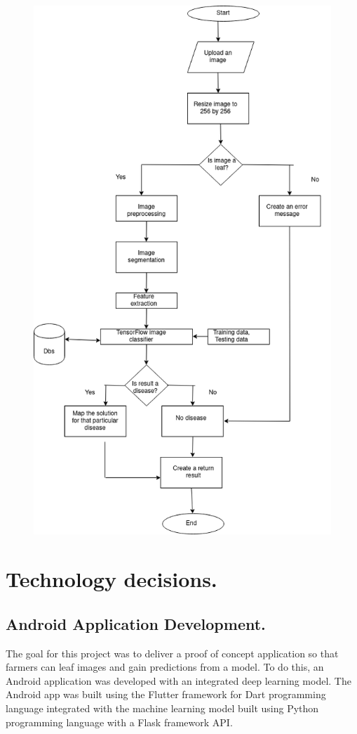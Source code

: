 \documentclass[11pt]{report}
\begin{document}
\begin{figure}[h]
	\centerline{\small 
		\includegraphics[height=0.5\textheight]  {flowchart}}
\end{figure}

\section{Technology decisions.}

\subsection{Android Application Development.}
The goal for this project was to deliver a proof of concept application so that farmers can leaf images and
gain predictions from a model. To do this, an Android application was developed with an integrated deep
learning model. The Android app was built using the Flutter framework for Dart programming language integrated with the machine learning model built using Python programming language with a Flask framework API.\\
\end{document}
